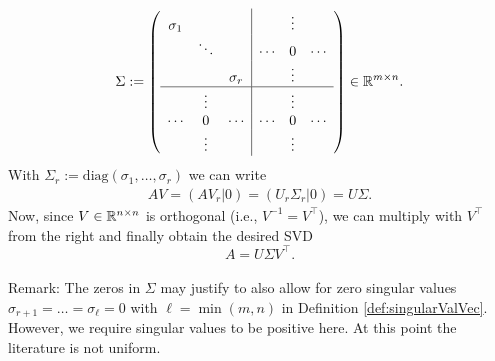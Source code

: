 \begin{frame}
{	$$\Sigma :=\left(\begin{array}{ccc|ccc}
	\sigma_1&&&&\vdots&\\
	&\ddots&&\cdots&0&\cdots\\
	&&\sigma_r&&\vdots&\\\hline
	&\vdots&&&\vdots&\\
	\cdots&0&\cdots&\cdots&0&\cdots\\
	&\vdots&&&\vdots&
	\end{array}\right) \in {\mathbb{R}}^{m\times n} .$$
	With $\Sigma_r := \text{diag}(\sigma_1,\ldots,\sigma_r)$ we can write
	\begin{align*}
	AV = (AV_r | 0) = (U_r \Sigma_r | 0) = U\Sigma .
	\end{align*}
	Now, since $V\in{\mathbb{R}}^{n\times n}$ is orthogonal (i.e., $V^{-1} = V^\top$), we can multiply with $V^\top$ from the right and finally obtain the desired SVD 
	$$A = U\Sigma V^\top .$$
	~\\
	Remark: The zeros in $\Sigma$ may justify to also allow for zero singular values $\sigma_{r+1}=\ldots=\sigma_{\ell} = 0$ with $\ell = \min(m,n)$ in Definition \ref{def:singularValVec}. However, we require singular values to be positive here. At this point the literature is not uniform.}
\end{frame}






%	





